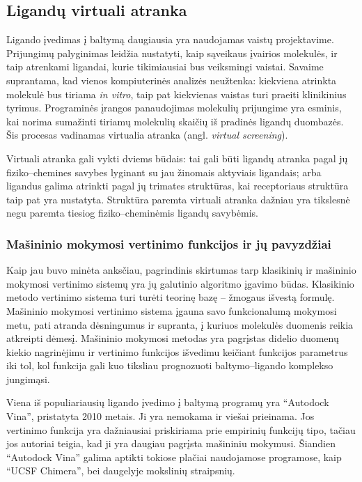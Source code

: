 \subsection{Ligandų virtuali atranka}

Ligando įvedimas į baltymą daugiausia yra naudojamas vaistų projektavime. Prijungimų palyginimas leidžia nustatyti, kaip sąveikaus įvairios molekulės, ir taip atrenkami ligandai, kurie tikimiausiai bus veiksmingi vaistai. Savaime suprantama, kad vienos kompiuterinės analizės neužtenka: kiekviena atrinkta molekulė bus tiriama \textit{in vitro}, taip pat kiekvienas vaistas turi praeiti klinikinius tyrimus. Programinės įrangos panaudojimas molekulių prijungime yra esminis, kai norima sumažinti tiriamų molekulių skaičių iš pradinės ligandų duombazės.\cite{pereira_boosting_2016} Šis procesas vadinamas virtualia atranka (angl. \textit{virtual screening}). 

Virtuali atranka gali vykti dviems būdais: tai gali būti ligandų atranka pagal jų fiziko--chemines savybes lyginant su jau žinomais aktyviais ligandais; arba ligandus galima atrinkti pagal jų trimates struktūras, kai receptoriaus struktūra taip pat yra nustatyta. Struktūra paremta virtuali atranka dažniau yra tikslesnė negu paremta tiesiog fiziko--cheminėmis ligandų savybėmis.\cite{pereira_boosting_2016}

\subsubsection{Mašininio mokymosi vertinimo funkcijos ir jų pavyzdžiai}
\label{sec:vertinimo_funkciju_pavyzdziai}

Kaip jau buvo minėta anksčiau, pagrindinis skirtumas tarp klasikinių ir mašininio mokymosi vertinimo sistemų yra jų galutinio algoritmo įgavimo būdas. Klasikinio metodo vertinimo sistema turi turėti teorinę bazę -- žmogaus išvestą formulę. Mašininio mokymosi vertinimo sistema įgauna savo funkcionalumą mokymosi metu, pati atranda dėsningumus ir supranta, į kuriuos molekulės duomenis reikia atkreipti dėmesį. Mašininio mokymosi metodas yra pagrįstas didelio duomenų kiekio nagrinėjimu ir vertinimo funkcijos išvedimu keičiant funkcijos parametrus iki tol, kol funkcija gali kuo tiksliau prognozuoti baltymo--ligando komplekso jungimąsi. 

Viena iš populiariausių ligando įvedimo į baltymą programų yra \enquote{Autodock Vina}\cite{trott_autodock_2010}, pristatyta 2010 metais. Ji yra nemokama ir viešai prieinama. Jos vertinimo funkcija yra dažniausiai priskiriama prie empirinių funkcijų tipo, tačiau jos autoriai teigia, kad ji yra daugiau pagrįsta mašininiu mokymusi. Šiandien \enquote{Autodock Vina} galima aptikti tokiose plačiai naudojamose programose, kaip \enquote{UCSF Chimera}, bei daugelyje mokslinių straipsnių.

